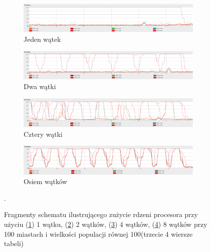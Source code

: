 \documentclass[10pt,a4paper]{article}
\begin{document}
\begin{figure}[H]
    \centering
    \begin{subfigure}[b]{\textwidth}
        \includegraphics[width=\textwidth]{32-1.png}
        \caption{Jeden wątek}
        \label{fig:32-1}
    \end{subfigure}
    
    \begin{subfigure}[b]{\textwidth}
        \includegraphics[width=\textwidth]{32-2.png}
        \caption{Dwa wątki}
        \label{fig:32-2}
    \end{subfigure}
    
    \begin{subfigure}[b]{\textwidth}
        \includegraphics[width=\textwidth]{32-4.png}
        \caption{Cztery wątki}
        \label{fig:32-4}
    \end{subfigure}
    
    \begin{subfigure}[b]{\textwidth}
            \includegraphics[width=\textwidth]{32-8.png}
            \caption{Osiem wątków}
            \label{fig:32-8}
    \end{subfigure}
    \caption{Fragmenty schematu ilustrującego zużycie rdzeni procesora przy użyciu (\ref{fig:32-1}) 1 wątku, (\ref{fig:32-2}) 2 wątków, (\ref{fig:32-4}) 4 wątków, (\ref{fig:32-8}) 8 wątków przy 100 miastach i wielkości populacji równej 100(trzecie 4 wiersze tabeli)}\label{fig:31}. 
\end{figure}
\end{document}
